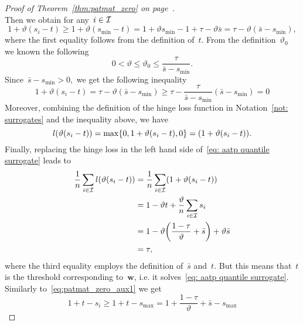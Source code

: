 \begin{proof}[Proof of Theorem~\ref{thm:patmat_zero} on page~\pageref{thm:patmat_zero}]
\begin{equation*}
  \end{equation*}
  Then we obtain for any~$i \in \mathcal{I}$
  \begin{equation*}
    1 + \vartheta(s_i - t)
      \geq 1 + \vartheta(s_{\min} - t)
      = 1 + \vartheta s_{\min} - 1 + \tau - \vartheta\bar{s}
      = \tau - \vartheta (\bar{s} - s_{\min}),
  \end{equation*}
  where the first equality follows from the definition of~$t.$ From the definition~$\vartheta_0$ we known the following
  \begin{equation*}
    0 < \vartheta \leq \vartheta_0 \leq \frac{\tau}{\bar{s} - s_{\min}}.
  \end{equation*}
  Since~$\bar{s} - s_{\min} > 0,$ we get the following inequality
  \begin{equation}\label{eq:patmat_zero_aux1}
    1 + \vartheta(s_i - t)
      = \tau - \vartheta (\bar{s} - s_{\min})
      \geq \tau - \frac{\tau}{\bar{s} - s_{\min}} (\bar{s} - s_{\min})
      = 0
  \end{equation}
  Moreover, combining the definition of the hinge loss function in Notation~\ref{not: surrogates} and the inequality above, we have
  \begin{equation*}
    l\Brac{\vartheta (s_i - t)} = \max\{0, 1 + \vartheta (s_i - t), 0\} = \Brac{1 + \vartheta(s_i - t)}.
  \end{equation*}
  Finally, replacing the hinge loss in the left hand side of~\eqref{eq: aatp quantile surrogate} leads to
  \begin{equation*}
    \begin{aligned}
      \frac{1}{n} \sum_{i \in \I} l\Brac{\vartheta (s_i - t)}
      & = \frac{1}{n}\sum_{i \in \I}\Brac{1 + \vartheta(s_i - t)} \\
      & = 1 - \vartheta t + \frac{\vartheta}{n} \sum_{i \in \I} s_i \\
      & = 1 - \vartheta \Brac{\frac{1 - \tau}{\vartheta} + \bar{s}} + \vartheta \bar{s} \\
      & = \tau,
    \end{aligned}
  \end{equation*}
  where the third equality employs the definition of~$\bar{s}$ and~$t$. But this means that~$t$ is the threshold corresponding to~$\bm{w}$, i.e. it solves~\eqref{eq: aatp quantile surrogate}. Similarly to~\eqref{eq:patmat_zero_aux1} we get
  \begin{equation}\label{eq:patmat_zero_aux2}
    1 + t - s_i
    \geq 1 + t-s_{\max}
    =   1 + \frac{1-\tau}{\vartheta} + \bar{s} - s_{\max}

\end{equation}
\end{proof}
